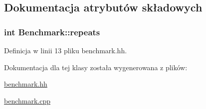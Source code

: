 \subsection{Dokumentacja atrybutów składowych}
\hypertarget{class_benchmark_a2cb1b6b7ddc2e10c65da4753c10b7fa6}{
\subsubsection[{repeats}]{\setlength{\rightskip}{0pt plus 5cm}int Benchmark\-::repeats\hspace{0.3cm}{\ttfamily [private]}}}\label{class_benchmark_a2cb1b6b7ddc2e10c65da4753c10b7fa6}


Definicja w linii 13 pliku benchmark.\-hh.



Dokumentacja dla tej klasy została wygenerowana z plików\-:\begin{DoxyCompactItemize}
\item 
\hyperlink{benchmark_8hh}{benchmark.\-hh}\item 
\hyperlink{benchmark_8cpp}{benchmark.\-cpp}\end{DoxyCompactItemize}
